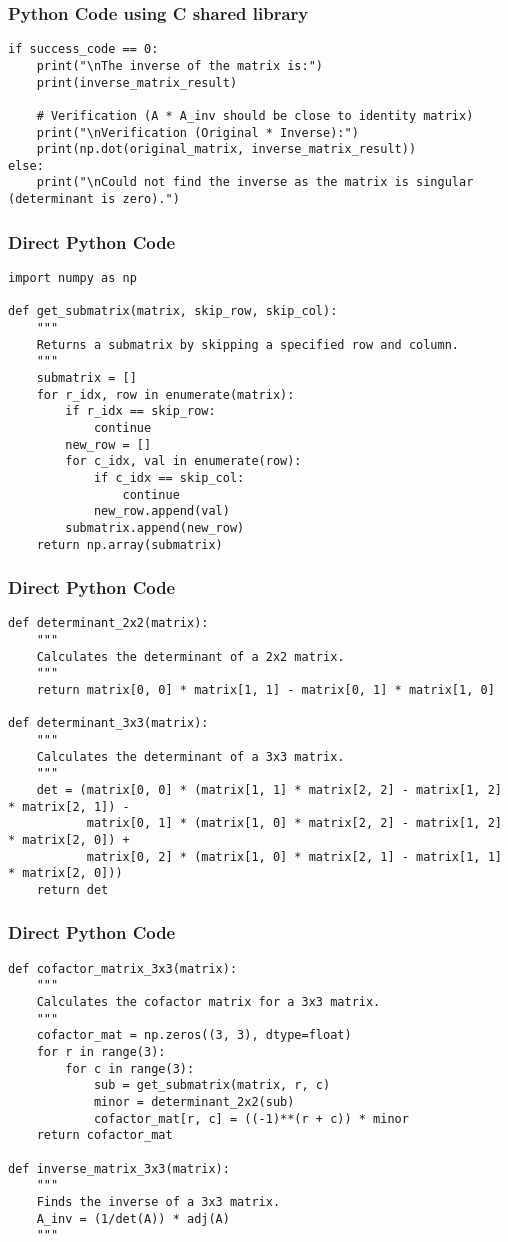 \documentclass{beamer}
\begin{document}
\begin{frame}[fragile]
\frametitle{Python Code using C shared library}
\begin{lstlisting}
if success_code == 0:
    print("\nThe inverse of the matrix is:")
    print(inverse_matrix_result)

    # Verification (A * A_inv should be close to identity matrix)
    print("\nVerification (Original * Inverse):")
    print(np.dot(original_matrix, inverse_matrix_result))
else:
    print("\nCould not find the inverse as the matrix is singular (determinant is zero).")
\end{lstlisting}
\end{frame}

\begin{frame}[fragile]
\frametitle{Direct Python Code}
\begin{lstlisting}
import numpy as np

def get_submatrix(matrix, skip_row, skip_col):
    """
    Returns a submatrix by skipping a specified row and column.
    """
    submatrix = []
    for r_idx, row in enumerate(matrix):
        if r_idx == skip_row:
            continue
        new_row = []
        for c_idx, val in enumerate(row):
            if c_idx == skip_col:
                continue
            new_row.append(val)
        submatrix.append(new_row)
    return np.array(submatrix)
\end{lstlisting}
\end{frame}

\begin{frame}[fragile]
\frametitle{Direct Python Code}
\begin{lstlisting}
def determinant_2x2(matrix):
    """
    Calculates the determinant of a 2x2 matrix.
    """
    return matrix[0, 0] * matrix[1, 1] - matrix[0, 1] * matrix[1, 0]

def determinant_3x3(matrix):
    """
    Calculates the determinant of a 3x3 matrix.
    """
    det = (matrix[0, 0] * (matrix[1, 1] * matrix[2, 2] - matrix[1, 2] * matrix[2, 1]) -
           matrix[0, 1] * (matrix[1, 0] * matrix[2, 2] - matrix[1, 2] * matrix[2, 0]) +
           matrix[0, 2] * (matrix[1, 0] * matrix[2, 1] - matrix[1, 1] * matrix[2, 0]))
    return det
\end{lstlisting}
\end{frame}

\begin{frame}[fragile]
\frametitle{Direct Python Code}
\begin{lstlisting}
def cofactor_matrix_3x3(matrix):
    """
    Calculates the cofactor matrix for a 3x3 matrix.
    """
    cofactor_mat = np.zeros((3, 3), dtype=float)
    for r in range(3):
        for c in range(3):
            sub = get_submatrix(matrix, r, c)
            minor = determinant_2x2(sub)
            cofactor_mat[r, c] = ((-1)**(r + c)) * minor
    return cofactor_mat

def inverse_matrix_3x3(matrix):
    """
    Finds the inverse of a 3x3 matrix.
    A_inv = (1/det(A)) * adj(A)
    """
\end{lstlisting}
\end{frame}
\end{document}
